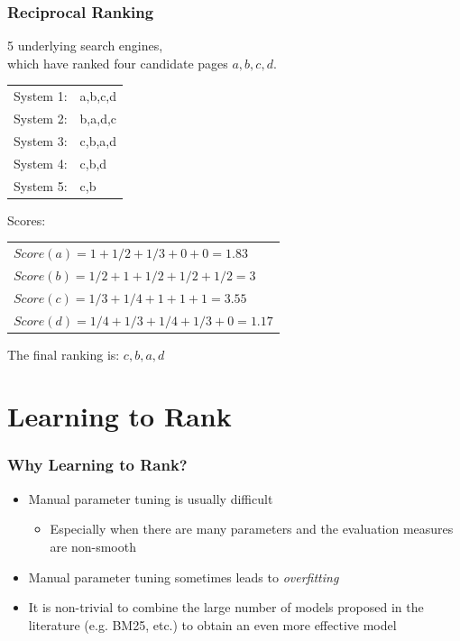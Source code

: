 \documentclass{beamer}
\begin{document}
\begin{frame}
    \frametitle{Reciprocal Ranking}


    \begin{block}{5 underlying search engines, \\ 
          which have ranked  four candidate pages $a,b,c,d$.}
        \begin{tabular}{ll}
          System 1: & a,b,c,d \\
          System 2: & b,a,d,c \\
          System 3: & c,b,a,d \\
          System 4: & c,b,d \\
          System 5: & c,b \\
        \end{tabular}

    \end{block}

    \begin{block} {Scores:} 

        \begin{tabular}{l}
          $Score(a) = 1 + 1/2 + 1/3 + 0 + 0 = 1.83 $ \\
          $Score(b) = 1/2 + 1 + 1/2 + 1/2 + 1/2 = 3 $ \\
          $Score(c) = 1/3 + 1/4 + 1 + 1 + 1 = 3.55$ \\
          $Score(d) = 1/4 + 1/3 + 1/4 + 1/3 + 0 = 1.17 $ \\
        \end{tabular}

    \end{block}


    The final ranking is: $c,b,a,d$

\end{frame}


\section{Learning to Rank}

\begin{frame}
    \frametitle{Why Learning to Rank?}
    \begin{itemize}
    \item Manual parameter tuning is usually difficult
        \begin{itemize}
        \item Especially when there are many parameters and the evaluation
            measures are non-smooth
        \end{itemize}
    \item Manual parameter tuning sometimes leads to \emph{overfitting}
    \item It is non-trivial to combine the large number of models proposed in
        the literature (e.g. BM25, etc.) to obtain an even more effective model
    \end{itemize}
\end{frame}
\end{document}
